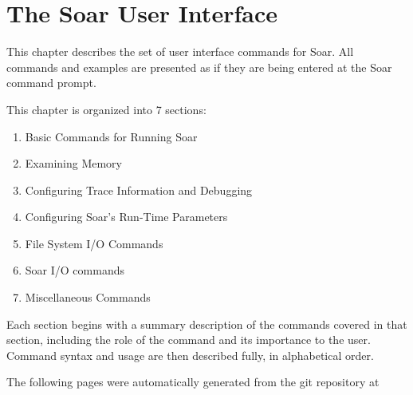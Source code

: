 \chapter{The Soar User Interface}
\label{INTERFACE}




This chapter describes the set of user interface commands for Soar. All commands and examples are presented as 
if they are being entered at the Soar command prompt.

This chapter is organized into 7 sections:
\begin{enumerate}
\item Basic Commands for Running Soar
\item Examining Memory
\item Configuring Trace Information and Debugging
\item Configuring Soar's Run-Time Parameters
\item File System I/O Commands
\item Soar I/O commands
\item Miscellaneous Commands
\end{enumerate}

Each section begins with a summary description of the commands covered
in that section, including the role of the command and its importance
to the user.  Command syntax and usage are then described fully, in
alphabetical order.

The following pages were automatically generated from the git repository
at

